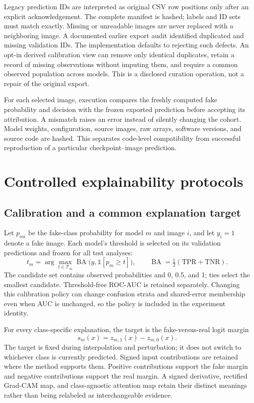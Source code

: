 \documentclass{article}
\newcommand{\BA}{\operatorname{BA}}
\newcommand{\ind}{\mathbb{1}}
\begin{document}
Legacy prediction IDs are interpreted as original CSV row positions only after an explicit acknowledgement. The complete manifest is hashed; labels and ID sets must match exactly. Missing or unreadable images are never replaced with a neighboring image. A documented earlier export audit identified duplicated and missing validation IDs. The implementation defaults to rejecting such defects. An opt-in derived calibration view can remove only identical duplicates, retain a record of missing observations without imputing them, and require a common observed population across models. This is a disclosed curation operation, not a repair of the original export.

For each selected image, execution compares the freshly computed fake probability and decision with the frozen exported prediction before accepting its attribution. A mismatch raises an error instead of silently changing the cohort. Model weights, configuration, source images, raw arrays, software versions, and source code are hashed. This separates code-level compatibility from successful reproduction of a particular checkpoint--image prediction.

\section{Controlled explainability protocols}
\subsection{Calibration and a common explanation target}
Let $p_{mi}$ be the fake-class probability for model $m$ and image $i$, and let $y_i=1$ denote a fake image. Each model's threshold is selected on its validation predictions and frozen for all test analyses:
\begin{equation}
 t_m=\arg\max_{t\in\mathcal T_m}\BA\bigl(y,\ind[p_m\geq t]\bigr),\qquad
 \BA=\tfrac12(\mathrm{TPR}+\mathrm{TNR}).
\end{equation}
The candidate set contains observed probabilities and 0, 0.5, and 1; ties select the smallest candidate. Threshold-free ROC-AUC is retained separately. Changing this calibration policy can change confusion strata and shared-error membership even when AUC is unchanged, so the policy is included in the experiment identity.

For every class-specific explanation, the target is the fake-versus-real logit margin
\begin{equation}
 s_m(x)=z_{m,1}(x)-z_{m,0}(x).
\end{equation}
The target is fixed during interpolation and perturbation; it does not switch to whichever class is currently predicted. Signed input contributions are retained where the method supports them. Positive contributions support the fake margin and negative contributions support the real margin. A signed derivative, rectified Grad-CAM map, and class-agnostic attention map retain their distinct meanings rather than being relabeled as interchangeable evidence.
\end{document}
